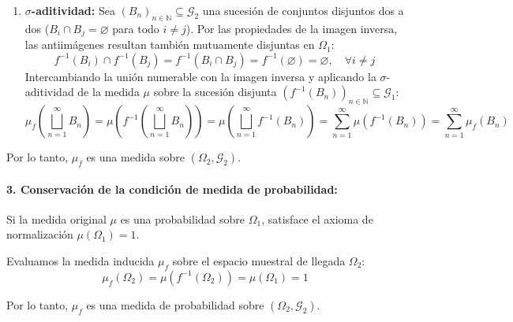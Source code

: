\begin{problema}
\begin{enumerate}[label=\arabic*.]
    \item \textbf{$\sigma$-aditividad:}
    Sea $(B_n)_{n \in \mathbb{N}} \subseteq \mathcal{G}_2$ una sucesión de conjuntos disjuntos dos a dos ($B_i \cap B_j = \varnothing$ para todo $i \neq j$).
    Por las propiedades de la imagen inversa, las antiimágenes resultan también mutuamente disjuntas en $\Omega_1$:
    \[
        f^{-1}(B_i) \cap f^{-1}(B_j) = f^{-1}(B_i \cap B_j) = f^{-1}(\varnothing) = \varnothing, \quad \forall i \neq j
    \]
    Intercambiando la unión numerable con la imagen inversa y aplicando la $\sigma$-aditividad de la medida $\mu$ sobre la sucesión disjunta $(f^{-1}(B_n))_{n \in \mathbb{N}} \subseteq \mathcal{G}_1$:
    \[
        \mu_f\left( \bigsqcup_{n=1}^\infty B_n \right) = \mu\left( f^{-1}\left( \bigsqcup_{n=1}^\infty B_n \right) \right) = \mu\left( \bigsqcup_{n=1}^\infty f^{-1}(B_n) \right) = \sum_{n=1}^\infty \mu(f^{-1}(B_n)) = \sum_{n=1}^\infty \mu_f(B_n)
    \]
\end{enumerate}

Por lo tanto, $\mu_f$ es una medida sobre $(\Omega_2, \mathcal{G}_2)$.

\begin{center}
    \vspace{0.2cm}
    \vspace{0.2cm}
\end{center}

\paragraph{3. Conservación de la condición de medida de probabilidad:}
Si la medida original $\mu$ es una probabilidad sobre $\Omega_1$, satisface el axioma de normalización $\mu(\Omega_1) = 1$.

Evaluamos la medida inducida $\mu_f$ sobre el espacio muestral de llegada $\Omega_2$:
\[
    \mu_f(\Omega_2) = \mu(f^{-1}(\Omega_2)) = \mu(\Omega_1) = 1
\]

Por lo tanto, $\mu_f$ es una medida de probabilidad sobre $(\Omega_2, \mathcal{G}_2)$.
\end{problema}

